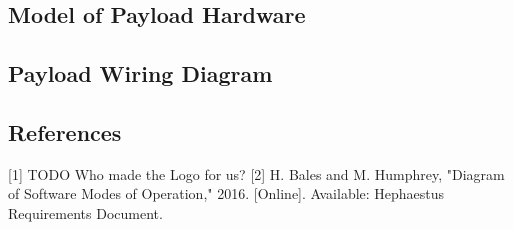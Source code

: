 \subsection{Model of Payload Hardware}
\subsection{Payload Wiring Diagram}
\subsection{References}
[1] TODO Who made the Logo for us?
[2] H. Bales and M. Humphrey, "Diagram of Software Modes of Operation," 2016. [Online]. Available: Hephaestus Requirements Document.

